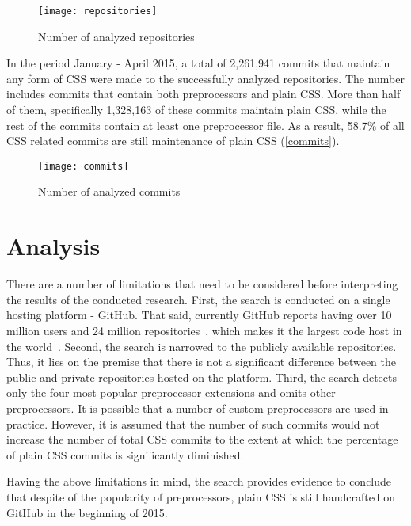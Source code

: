 \begin{figure}[h!]
  \centering
  \caption{
  	\label{repositories}
  	Number of analyzed repositories}
  \texttt{[image: repositories]}
\end{figure}

In the period January - April 2015, a total of 2,261,941 commits that maintain
any form of CSS were made to the successfully analyzed repositories. The
number includes commits that contain both preprocessors and plain CSS. More
than half of them, specifically 1,328,163 of these commits maintain plain CSS,
while the rest of the commits contain at least one preprocessor file. As a
result, 58.7\% of all CSS related commits are still maintenance of plain CSS
(\autoref{commits}).

\begin{figure}[h!]
  \centering
  \caption{
  	\label{commits}
  	Number of analyzed commits}
  \texttt{[image: commits]}
\end{figure}

\section{Analysis}

There are a number of limitations that need to be considered before
interpreting the results of the conducted research. First, the search is
conducted on a single hosting platform - GitHub. That said, currently GitHub
reports having over 10 million users and 24 million
repositories~\cite{GitHub}, which makes it the largest code host in the
world~\cite{gousios2014lean}. Second, the search is narrowed to the publicly
available repositories. Thus, it lies on the premise that there is not a
significant difference between the public and private repositories hosted on
the platform. Third, the search detects only the four most popular
preprocessor extensions and omits other preprocessors. It is possible that a
number of custom preprocessors are used in practice. However, it is assumed
that the number of such commits would not increase the number of total CSS
commits to the extent at which the percentage of plain CSS commits is
significantly diminished.

Having the above limitations in mind, the search provides evidence to conclude
that despite of the popularity of preprocessors, plain CSS is still
handcrafted on GitHub in the beginning of 2015.

